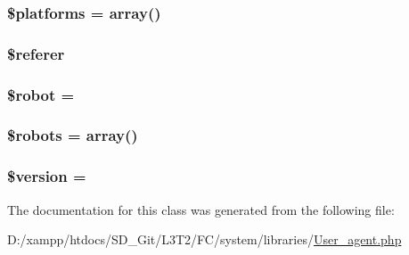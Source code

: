 \subsubsection[{\$platforms}]{\setlength{\rightskip}{0pt plus 5cm}\$platforms = array()}\label{class_c_i___user__agent_a1c1a0a860242698ee6b3f4ef7d6eb343}
\hypertarget{class_c_i___user__agent_a872d93ddbbb879ab5c0eb29261a520a4}{}
\subsubsection[{\$referer}]{\setlength{\rightskip}{0pt plus 5cm}\$referer}\label{class_c_i___user__agent_a872d93ddbbb879ab5c0eb29261a520a4}
\hypertarget{class_c_i___user__agent_aaf86508e45876d0081cadac4cb8a8808}{}
\subsubsection[{\$robot}]{\setlength{\rightskip}{0pt plus 5cm}\${\bf robot} = \textquotesingle{}\textquotesingle{}}\label{class_c_i___user__agent_aaf86508e45876d0081cadac4cb8a8808}
\hypertarget{class_c_i___user__agent_a5752e2a66d1c03bc34666492746037ab}{}
\subsubsection[{\$robots}]{\setlength{\rightskip}{0pt plus 5cm}\$robots = array()}\label{class_c_i___user__agent_a5752e2a66d1c03bc34666492746037ab}
\hypertarget{class_c_i___user__agent_a17c8948c68aa44fa9961ae169b6a8961}{}
\subsubsection[{\$version}]{\setlength{\rightskip}{0pt plus 5cm}\${\bf version} = \textquotesingle{}\textquotesingle{}}\label{class_c_i___user__agent_a17c8948c68aa44fa9961ae169b6a8961}


The documentation for this class was generated from the following file\+:\begin{DoxyCompactItemize}
\item 
D\+:/xampp/htdocs/\+S\+D\+\_\+\+Git/\+L3\+T2/\+F\+C/system/libraries/\hyperlink{_user__agent_8php}{User\+\_\+agent.\+php}\end{DoxyCompactItemize}
